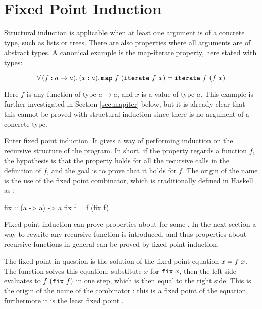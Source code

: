 \section{Fixed Point Induction}
\label{sec:fixpoint}

Structural induction is applicable when at least one argument is of a
concrete type, such as lists or trees. There are also properties where
all arguments are of abstract types. A canonical example is the
map-iterate property, here stated with types:

\begin{equation*}
\faa{(f : a \rightarrow a)}{(x : a)} \hs{map} \w f \w (\hs{iterate} \w f \w x) \eq
           \hs{iterate} \w f \w (f \w x)
\end{equation*}

Here $f$ is any function of type $a \rightarrow a$, and $x$ is a value
of type $a$. This example is further investigated in Section
\ref{sec:mapiter} below, but it is already clear that this cannot be
proved with structural induction since there is no argument of a
concrete type.

Enter fixed point induction. It gives a way of performing induction on
the recursive structure of the program. In short, if the property
regards a function $f$, the hypothesis is that the property holds for
all the recursive calls in the definition of $f$, and the goal is to
prove that it holds for $f$. The origin of the name is the use of the
fixed point combinator, which is traditionally defined in Haskell as
:

\begin{code}
fix :: (a -> a) -> a
fix f = f (fix f)
\end{code}

Fixed point induction can prove properties about  for some
. In the next section a way to rewrite any recursive function is
introduced, and thus properties about recursive functions in general
can be proved by fixed point induction.

The fixed point in question is the solution of the fixed point
equation $x = f \,\, x$. The function  solves this equation:
substitute $x$ for $\hs{fix} \w x$, then the left side evaluates to $f
\w (\hs{fix} \w f)$ in one step, which is then equal to the right
side. This is the origin of the name of the combinator : this
is a fixed point of the equation, furthermore it is the least fixed
point \citep{domains}.

